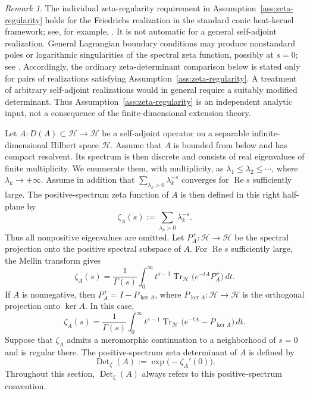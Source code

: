 \documentclass[12pt]{amsart}
\theoremstyle{plain}
\theoremstyle{definition}
\theoremstyle{remark}
\newtheorem*{rem}{Remark}
\numberwithin{equation}{section} \numberwithin{figure}{section}
\renewcommand*{\to}{\rightarrow}
\begin{document}
\begin{rem}
The individual zeta-regularity requirement in
Assumption~\ref{ass:zeta-regularity} holds for the Friedrichs
realization in the standard conic heat-kernel framework; see, for
example, \cite{LP}. It is not automatic for a general self-adjoint
realization. General
Lagrangian boundary conditions may produce nonstandard poles or
logarithmic singularities of the spectral zeta function, possibly at
\(s=0\); see \cite{KirstenLoyaParkExotic}. Accordingly, the ordinary
zeta-determinant comparison below is stated only for pairs of
realizations satisfying Assumption~\ref{ass:zeta-regularity}. A
treatment of arbitrary self-adjoint realizations would in general
require a suitably modified determinant. Thus
Assumption~\ref{ass:zeta-regularity} is an independent analytic input,
not a consequence of the finite-dimensional extension theory.
\end{rem}

Let \(A:D(A)\subset\mathcal H\to\mathcal H\) be a self-adjoint
operator on a separable infinite-dimensional Hilbert space
\(\mathcal H\). Assume that \(A\) is bounded from below and has
compact resolvent. Its spectrum is then discrete and consists of
real eigenvalues of finite multiplicity. We enumerate them, with
multiplicity, as
\(\lambda_1\leq\lambda_2\leq\cdots\), where
\(\lambda_k\to+\infty\).
Assume in addition that
\(\sum_{\lambda_k>0}\lambda_k^{-s}\) converges for
\(\operatorname{Re}s\) sufficiently large. The positive-spectrum
zeta function of \(A\) is then defined in this right half-plane by
\[
\zeta_A(s):=
\sum_{\lambda_k>0}\lambda_k^{-s}.
\]
Thus all nonpositive eigenvalues are omitted.
Let \(P_A^+:\mathcal H\to\mathcal H\) be the spectral projection
onto the positive spectral subspace of \(A\). For
\(\operatorname{Re}s\) sufficiently large, the Mellin transform
gives
\[
\zeta_A(s)
=
\frac{1}{\Gamma(s)}
\int_0^\infty
t^{s-1}
\operatorname{Tr}_{\mathcal H}
\bigl(e^{-tA}P_A^+\bigr)\,dt.
\]
If \(A\) is nonnegative, then
\(P_A^+=I-P_{\ker A}\), where
\(P_{\ker A}:\mathcal H\to\mathcal H\) is the orthogonal projection
onto \(\ker A\). In this case,
\[
\zeta_A(s)
=
\frac{1}{\Gamma(s)}
\int_0^\infty
t^{s-1}
\operatorname{Tr}_{\mathcal H}
\bigl(e^{-tA}-P_{\ker A}\bigr)\,dt.
\]
Suppose that \(\zeta_A\) admits a meromorphic continuation to a
neighborhood of \(s=0\) and is regular there. The positive-spectrum
zeta determinant of \(A\) is defined by
\[
\operatorname{Det}_{\zeta}(A)
:=
\exp\bigl(-\zeta_A'(0)\bigr).
\]
Throughout this section,
\(\operatorname{Det}_{\zeta}(A)\) always refers to this
positive-spectrum convention.
\end{document}
